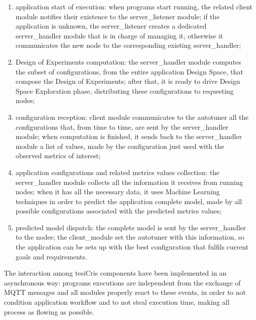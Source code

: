 \begin{enumerate}

    \item application start of execution: when programs start running, the related client module notifies their existence to the server\_listener module; if the application is unknown, the server\_listener creates a dedicated server\_handler module that is in charge of managing it, otherwise it communicates the new node to the corresponding existing server\_handler;
    
    \item Design of Experiments computation: the server\_handler module computes the subset of configurations, from the entire application Design Space, that compose the Design of Experiments; after that, it is ready to drive Design Space Exploration phase, distributing these configurations to requesting nodes;
    
    \item configuration reception: client module communicates to the autotuner all the configurations that, from time to time, are sent by the ser\-ver\_han\-dler module; when computation is finished, it sends back to the ser\-ver\_han\-dler module a list of values, made by the configuration just used with the observed metrics of interest;
    
    \item application configurations and related metrics values collection: the server\_handler module collects all the information it receives from running nodes; when it has all the necessary data, it uses Machine Learning techniques in order to predict the application complete model, made by all possible configurations associated with the predicted metrics values;
    
    \item predicted model dispatch: the complete model is sent by the ser\-ver\_han\-dler to the nodes; the client\_module set the autotuner with this information, so the application can be sets up with the best configuration that fulfils current goals and requirements.

\end{enumerate}

The interaction among tesiCris components have been implemented in an asynchronous way: programs executions are independent from the exchange of MQTT messages and all modules properly react to these events, in order to not condition application workflow and to not steal execution time, making all process as flowing as possible.
